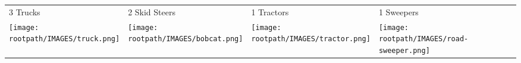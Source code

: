 \begin{tabular}{m{}m{}m{}m{}}
    {\color{ccorange} 3 Trucks} & {\color{ccorange} 2 Skid Steers} & {\color{ccorange} 1 Tractors} & {\color{ccorange} 1 Sweepers} \\
    \texttt{[image: \\rootpath/IMAGES/truck.png]}  & \texttt{[image: \\rootpath/IMAGES/bobcat.png]} & \texttt{[image: \\rootpath/IMAGES/tractor.png]} & \texttt{[image: \\rootpath/IMAGES/road-sweeper.png]}                         
    \end{tabular}